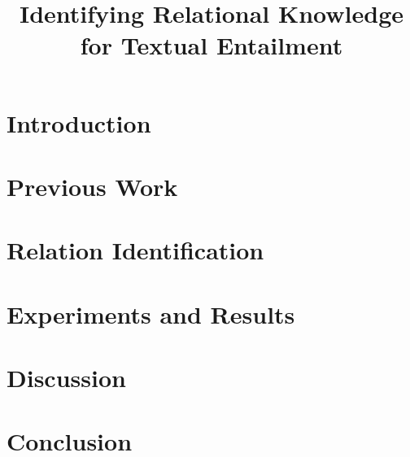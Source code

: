 \documentclass[11pt]{article}
\title{Identifying Relational Knowledge for Textual Entailment}
\author{}
\date{}
\begin{document}
\maketitle

\begin{abstract}

\end{abstract}

\section{Introduction}
\label{sec:intro}


\section{Previous Work}
\label{sec:relatedwork}


%

\section{Relation Identification}
\label{sec:approach}


\section{Experiments and Results}
\label{sec:experiments}


\section{Discussion}
\label{sec:discussion}


\section{Conclusion}
\label{sec:conclusion}





\end{document}
